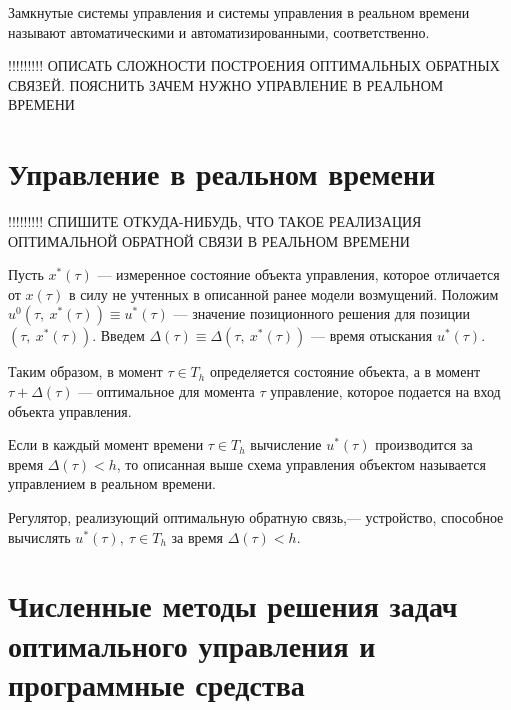Замкнутые системы управления и системы управления в реальном времени называют автоматическими и автоматизированными, соответственно.

\bigskip
!!!!!!!!! ОПИСАТЬ СЛОЖНОСТИ ПОСТРОЕНИЯ ОПТИМАЛЬНЫХ ОБРАТНЫХ СВЯЗЕЙ. ПОЯСНИТЬ ЗАЧЕМ НУЖНО УПРАВЛЕНИЕ В РЕАЛЬНОМ ВРЕМЕНИ

\bigskip



\section{Управление в реальном времени}\label{1_3}

\bigskip
!!!!!!!!! СПИШИТЕ ОТКУДА-НИБУДЬ, ЧТО ТАКОЕ РЕАЛИЗАЦИЯ ОПТИМАЛЬНОЙ ОБРАТНОЙ СВЯЗИ В РЕАЛЬНОМ ВРЕМЕНИ

\bigskip



Пусть $x^*(\tau)$ --- измеренное состояние объекта управления, которое отличается от $x(\tau)$ в силу не учтенных в описанной ранее модели возмущений. Положим $u^0(\tau, ~x^*(\tau)) \equiv u^*(\tau)$ --- значение позиционного решения для позиции $(\tau, ~x^*(\tau))$.  Введем $\Delta(\tau) \equiv \Delta(\tau, ~x^*(\tau))$ --- время отыскания $u^*(\tau)$.


Таким образом, в момент $\tau \in T_h$ определяется состояние объекта, а в момент $\tau + \Delta(\tau)$ --- оптимальное для момента $\tau$ управление, которое подается на вход объекта управления.


\begin{definition}  Если в каждый момент времени $\tau \in T_h$ вычисление $u^*(\tau)$ производится за время $\Delta(\tau) < h$, то описанная выше схема управления объектом называется управлением в реальном времени.
\end{definition}


\begin{definition}   Регулятор, реализующий оптимальную обратную связь,--- устройство, способное вычислять $u^*(\tau),	 ~\tau \in T_h$ за время $\Delta(\tau) < h$.
\end{definition}


\section{Численные методы решения задач оптимального управления и программные средства}\label{1_4}


